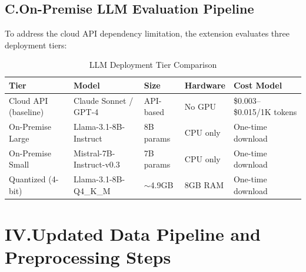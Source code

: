 \documentclass[12pt]{article}
\begin{document}
\subsection*{C.\quad On-Premise LLM Evaluation Pipeline}

To address the cloud API dependency limitation, the extension evaluates three deployment tiers:

\begin{table}[h]
\centering
\caption{LLM Deployment Tier Comparison}
\label{tab:llm_tiers}
\begin{tabular}{@{}p{3cm}p{3cm}p{2cm}p{2cm}p{3cm}@{}}
\toprule
\textbf{Tier} & \textbf{Model} & \textbf{Size} & \textbf{Hardware} & \textbf{Cost Model} \\
\midrule
Cloud API (baseline) & Claude Sonnet / GPT-4 & API-based & No GPU & \$0.003--\$0.015/1K tokens \\
On-Premise Large & Llama-3.1-8B-Instruct & 8B params & CPU only & One-time download \\
On-Premise Small & Mistral-7B-Instruct-v0.3 & 7B params & CPU only & One-time download \\
Quantized (4-bit) & Llama-3.1-8B-Q4\_K\_M & $\sim$4.9GB & 8GB RAM & One-time download \\
\bottomrule
\end{tabular}
\end{table}

\bigskip

\section*{IV.\quad Updated Data Pipeline and Preprocessing Steps}
\end{document}
